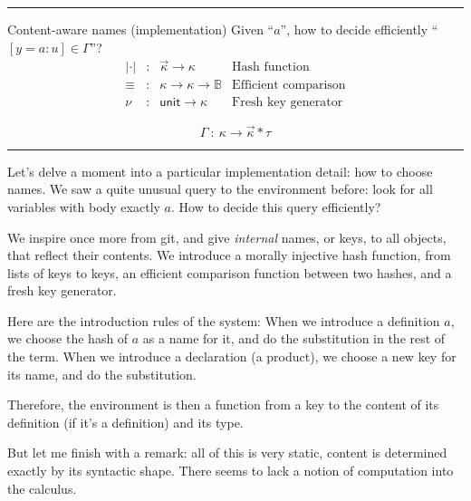 \documentclass[ignorenonframetext,red]{beamer}
\begin{document}
\hrule
\begin{frame}{Content-aware names (implementation)}
  Given ``$a$'', how to decide efficiently ``$[y = a : u] \in
  \Gamma$''?
  \pause
  \[ \begin{array}{lllr}
    | \cdot | &:& \vec\kappa \rightarrow \kappa & \text{Hash function}\\
    \equiv    &:& \kappa \rightarrow \kappa \rightarrow \mathbb{B} & \text{Efficient comparison}\\
    \nu       &:& \textsf{unit} \rightarrow \kappa & \text{Fresh key generator}
  \end{array} \]
  \pause
  \pause
  \Large
  \[ \Gamma\ :\ \kappa \to \vec\kappa * \tau \]
\end{frame}
\hrule

Let's delve a moment into a particular implementation detail: how to
choose names. We saw a quite unusual query to the environment before:
look for all variables with body exactly $a$. How to decide this query
efficiently?

We inspire once more from \textsf{git}, and give \emph{internal}
names, or keys, to all objects, that reflect their contents. We
introduce a morally injective hash function, from lists of keys to
keys, an efficient comparison function between two hashes, and a fresh
key generator.

Here are the introduction rules of the system: When we introduce a
definition $a$, we choose the hash of $a$ as a name for it, and do the
substitution in the rest of the term. When we introduce a declaration
(a product), we choose a new key for its name, and do the
substitution.

Therefore, the environment is then a function from a key to the
content of its definition (if it's a definition) and its type.

But let me finish with a remark: all of this is very static, content
is determined exactly by its syntactic shape. There seems to lack a
notion of computation into the calculus.
\end{document}
